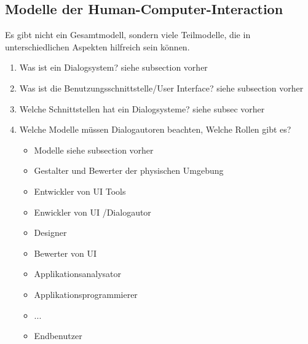\subsection{Modelle der Human-Computer-Interaction}
Es gibt nicht ein Gesamtmodell, sondern viele Teilmodelle, die in
unterschiedlichen Aspekten hilfreich sein können.
\begin{enumerate}
	\item Was ist ein Dialogsystem?
	siehe subsection vorher
	
	\item Was ist die Benutzungsschnittstelle/User Interface?
	siehe subsection vorher
	
	\item Welche Schnittstellen hat ein Dialogsysteme?
	siehe subsec vorher
	
	\item Welche Modelle müssen Dialogautoren beachten, Welche Rollen gibt es?
	\begin{itemize}
		\item Modelle siehe subsection vorher
		\item Gestalter und Bewerter der physischen Umgebung
		\item Entwickler von UI Tools
		\item Enwickler von UI /Dialogautor
		\item Designer
		\item Bewerter von UI
		\item Applikationsanalysator
		\item Applikationsprogrammierer
		\item ...
		\item Endbenutzer
	\end{itemize}
	

\end{enumerate}
